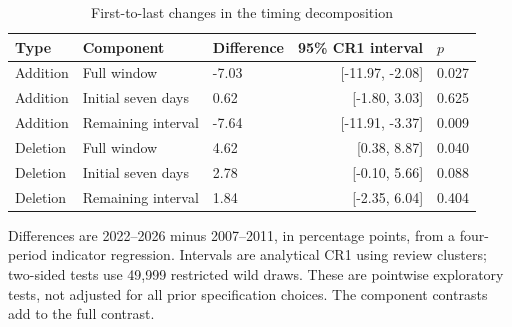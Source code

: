 \begin{table}[!htbp]
\centering
\caption{First-to-last changes in the timing decomposition}\label{tab:timing_contrasts}
\small
\setlength{\tabcolsep}{5pt}
\begin{tabular}{lllrl}
\toprule
Type & Component & Difference & 95\% CR1 interval & $p$ \\
\midrule
Addition & Full window & -7.03 & [-11.97, -2.08] & 0.027 \\
Addition & Initial seven days & 0.62 & [-1.80, 3.03] & 0.625 \\
Addition & Remaining interval & -7.64 & [-11.91, -3.37] & 0.009 \\
Deletion & Full window & 4.62 & [0.38, 8.87] & 0.040 \\
Deletion & Initial seven days & 2.78 & [-0.10, 5.66] & 0.088 \\
Deletion & Remaining interval & 1.84 & [-2.35, 6.04] & 0.404 \\
\bottomrule
\end{tabular}
\begin{minipage}{\linewidth}\footnotesize\vspace{5pt}
Differences are 2022--2026 minus 2007--2011, in percentage points, from a four-period indicator regression. Intervals are analytical CR1 using review clusters; two-sided tests use 49,999 restricted wild draws. These are pointwise exploratory tests, not adjusted for all prior specification choices. The component contrasts add to the full contrast.
\end{minipage}
\end{table}
